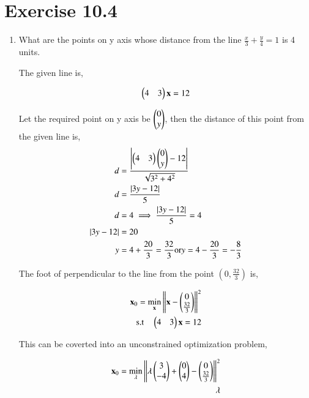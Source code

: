 \documentclass[journal,12pt,twocolumn]{IEEEtran}
\begin{document}
\section{Exercise 10.4}
\begin{enumerate}
	\item What are the points on y axis whose distance from the line $\frac{x}{3}+\frac{y}{4}=1$ is 4 units.
	
		The given line is,

		\begin{align}
			\begin{pmatrix}4 & 3\end{pmatrix}\mathbf{x} = 12
		\end{align}

		Let the required point on y axis be $\begin{pmatrix}0\\y\end{pmatrix}$, then the distance of this point from the given line is,   
		\begin{align}
			d &= \frac{\left\vert\begin{pmatrix}4 & 3\end{pmatrix}\begin{pmatrix}0\\y\end{pmatrix}-12\right\vert}{\sqrt{3^2+4^2}}\\
			d &= \frac{\left\vert3y-12\right\vert}{5}\\
			d &= 4 \implies \frac{\left\vert3y-12\right\vert}{5} = 4\\
			\left\vert3y-12\right\vert &= 20\\
			y &= 4 + \frac{20}{3}=\frac{32}{3} \text{or} y = 4 - \frac{20}{3}=-\frac{8}{3}\\
		\end{align}

The foot of perpendicular to the line from the point $(0,\frac{32}{3})$ is,

		\begin{align}
			\mathbf{x}_0 = \min_{\mathbf{x}} \left\lVert\mathbf{x}-\begin{pmatrix}0\\\frac{32}{3}\end{pmatrix}\right\rVert^2\\
			\text{s.t} \quad \begin{pmatrix}4 & 3\end{pmatrix}\mathbf{x} = 12
		\end{align}

This can be coverted into an unconstrained optimization problem,
	
		\begin{align}
			\mathbf{x}_0 = \min_{\mathbf{\lambda}} \left\lVert\lambda \begin{pmatrix}3\\-4\end{pmatrix}+\begin{pmatrix}0\\4\end{pmatrix}-\begin{pmatrix}0\\\frac{32}{3}\end{pmatrix}\right\rVert^2\\
			\lambda
		\end{align}


\end{enumerate}
\end{document}
